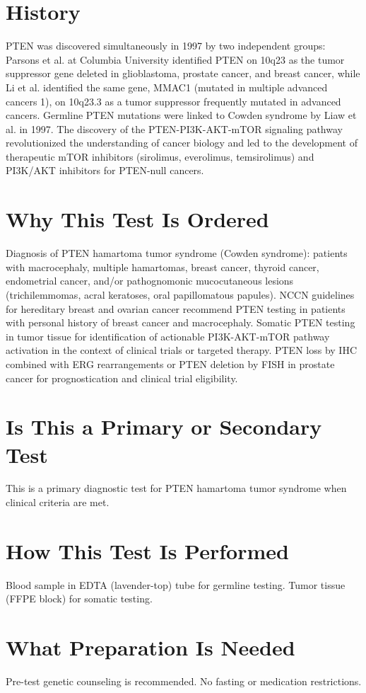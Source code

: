 \section*{History}
PTEN was discovered simultaneously in 1997 by two independent groups: Parsons et al. at Columbia University identified PTEN on 10q23 as the tumor suppressor gene deleted in glioblastoma, prostate cancer, and breast cancer, while Li et al. identified the same gene, MMAC1 (mutated in multiple advanced cancers 1), on 10q23.3 as a tumor suppressor frequently mutated in advanced cancers. Germline PTEN mutations were linked to Cowden syndrome by Liaw et al. in 1997. The discovery of the PTEN-PI3K-AKT-mTOR signaling pathway revolutionized the understanding of cancer biology and led to the development of therapeutic mTOR inhibitors (sirolimus, everolimus, temsirolimus) and PI3K/AKT inhibitors for PTEN-null cancers.

\section*{Why This Test Is Ordered}
Diagnosis of PTEN hamartoma tumor syndrome (Cowden syndrome): patients with macrocephaly, multiple hamartomas, breast cancer, thyroid cancer, endometrial cancer, and/or pathognomonic mucocutaneous lesions (trichilemmomas, acral keratoses, oral papillomatous papules). NCCN guidelines for hereditary breast and ovarian cancer recommend PTEN testing in patients with personal history of breast cancer and macrocephaly. Somatic PTEN testing in tumor tissue for identification of actionable PI3K-AKT-mTOR pathway activation in the context of clinical trials or targeted therapy. PTEN loss by IHC combined with ERG rearrangements or PTEN deletion by FISH in prostate cancer for prognostication and clinical trial eligibility.

\section*{Is This a Primary or Secondary Test}
This is a primary diagnostic test for PTEN hamartoma tumor syndrome when clinical criteria are met.

\section*{How This Test Is Performed}
Blood sample in EDTA (lavender-top) tube for germline testing. Tumor tissue (FFPE block) for somatic testing.

\section*{What Preparation Is Needed}
Pre-test genetic counseling is recommended. No fasting or medication restrictions.

